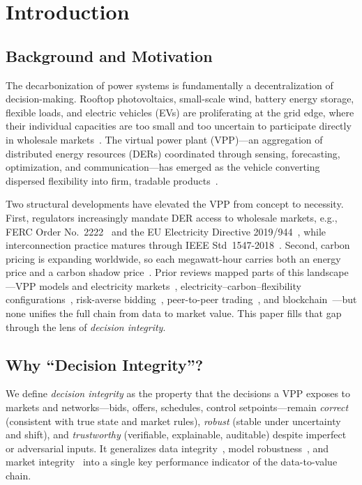 \documentclass[journal]{IEEEtran}
\begin{document}
\section{Introduction}
\subsection{Background and Motivation}
The decarbonization of power systems is fundamentally a decentralization of decision-making. Rooftop photovoltaics, small-scale wind, battery energy storage, flexible loads, and electric vehicles (EVs) are proliferating at the grid edge, where their individual capacities are too small and too uncertain to participate directly in wholesale markets~\cite{naval2021, pudjianto2007, pudjianto2008}. The virtual power plant (VPP)---an aggregation of distributed energy resources (DERs) coordinated through sensing, forecasting, optimization, and communication---has emerged as the vehicle converting dispersed flexibility into firm, tradable products~\cite{pudjianto2007,pudjianto2008}.

Two structural developments have elevated the VPP from concept to necessity. First, regulators increasingly mandate DER access to wholesale markets, e.g., FERC Order No.~2222~\cite{ferc2222} and the EU Electricity Directive 2019/944~\cite{eudirective2019}, while interconnection practice matures through IEEE Std~1547-2018~\cite{ieee1547}. Second, carbon pricing is expanding worldwide, so each megawatt-hour carries both an energy price and a carbon shadow price~\cite{liu2023, ipcc2022}. Prior reviews mapped parts of this landscape---VPP models and electricity markets~\cite{naval2021}, electricity--carbon--flexibility configurations~\cite{zare2026}, risk-averse bidding~\cite{xiao2025}, peer-to-peer trading~\cite{sousa2019}, and blockchain~\cite{andoni2019}---but none unifies the full chain from data to market value. This paper fills that gap through the lens of \textit{decision integrity}.

\subsection{Why ``Decision Integrity''?}
We define \textit{decision integrity} as the property that the decisions a VPP exposes to markets and networks---bids, offers, schedules, control setpoints---remain \textit{correct} (consistent with true state and market rules), \textit{robust} (stable under uncertainty and shift), and \textit{trustworthy} (verifiable, explainable, auditable) despite imperfect or adversarial inputs. It generalizes data integrity~\cite{liu2011fdi, liang2017}, model robustness~\cite{goodfellow2015, esfahani2018}, and market integrity~\cite{andoni2019} into a single key performance indicator of the data-to-value chain.
\end{document}
